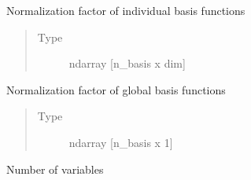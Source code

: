 \documentclass[letterpaper,10pt,english,openany,oneside]{sphinxmanual}
\begin{document}
\begin{fulllineitems}
\begin{fulllineitems}
\begin{quote}
\begin{description}
\end{description}\end{quote}

\end{fulllineitems}


\begin{fulllineitems}
\label{\detokenize{pygpc:pygpc.Basis.Basis.b_norm}}
Normalization factor of individual basis functions
\begin{quote}\begin{description}
\item[{Type}] \leavevmode
ndarray {[}n\_basis x dim{]}

\end{description}\end{quote}

\end{fulllineitems}


\begin{fulllineitems}
\label{\detokenize{pygpc:pygpc.Basis.Basis.b_norm_basis}}
Normalization factor of global basis functions
\begin{quote}\begin{description}
\item[{Type}] \leavevmode
ndarray {[}n\_basis x 1{]}

\end{description}\end{quote}

\end{fulllineitems}


\begin{fulllineitems}
\label{\detokenize{pygpc:pygpc.Basis.Basis.dim}}
Number of variables

\end{fulllineitems}



\end{fulllineitems}
\end{document}
